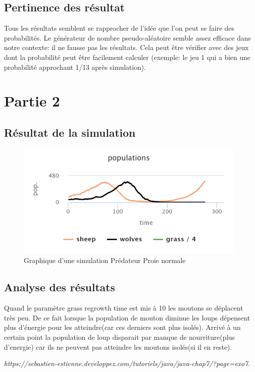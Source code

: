 \documentclass{article}
\begin{document}
\subsection{Pertinence des résultat}
\vspace{0.5cm}
Tous les résultats semblent se rapprocher de l'idée que l'on peut se faire des probabilités. Le générateur de nombre pseudo-aléatoire semble assez efficace dans notre contexte: il ne fausse pas les résultats. Cela peut être vérifier avec des jeux dont la probabilité peut être facilement calculer (exemple: le jeu 1 qui a bien une probabilité approchant 1/13 après simulation).
\clearpage

\newpage
\section{Partie 2}
\subsection{Résultat de la simulation}
\begin{figure}[htbp]
	\includegraphics[width=1.0\textwidth]{chart.png}
		\caption{Graphique d'une simulation Prédateur Proie normale}
	\label{fig:chart}
\end{figure}
\subsection{Analyse des résultats}
Quand le paramètre grass regrowth time est mis à 10 les moutons se déplacent très peu. De ce fait lorsque la population de mouton diminue les loups dépensent plus d’énergie pour les atteindre(car ces derniers sont plus isolés). Arrivé à un certain point la population de loup disparait par manque de nourriture(plus d’energie) car ils ne peuvent pas atteindre les moutons isolés(si il en reste).


\clearpage
\newpage

\begin{thebibliography}{9}
	  \emph{https://sebastien-estienne.developpez.com/tutoriels/java/java-chap7/?page=exo7}.
\end{thebibliography}
\end{document}
